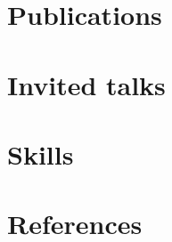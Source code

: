\documentclass{helvetica_neue_cv}
\begin{document}
\section{Publications}



\section{Invited talks}


\section{Skills}


\section{References}

\end{document}
